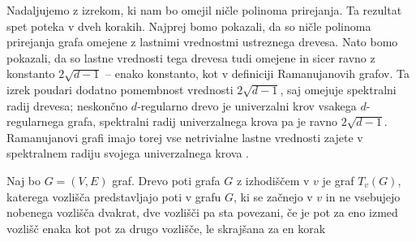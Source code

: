 Nadaljujemo z izrekom, ki nam bo omejil ničle polinoma prirejanja. Ta rezultat spet poteka v dveh korakih. Najprej bomo pokazali, da so ničle polinoma prirejanja grafa omejene z lastnimi vrednostmi ustreznega drevesa. Nato bomo pokazali, da so lastne vrednosti tega drevesa tudi omejene in sicer ravno z konstanto \(2\sqrt{d-1}\) -- enako konstanto, kot v definiciji Ramanujanovih grafov. Ta izrek poudari dodatno pomembnost vrednosti \(2\sqrt{d-1}\), saj omejuje spektralni radij drevesa; neskončno \(d\)-regularno drevo je univerzalni krov vsakega \(d\)-regularnega grafa, spektralni radij univerzalnega krova pa je ravno \(2\sqrt{d-1}\). Ramanujanovi grafi imajo torej vse netrivialne lastne vrednosti zajete v spektralnem radiju svojega univerzalnega krova \cite{hoory}.

\begin{definicija}
    Naj bo \(G=(V, E)\) graf. Drevo poti grafa \(G\) z izhodiščem v \(v\) je graf \(T_v(G)\), katerega vozlišča predstavljajo poti v grafu \(G\), ki se začnejo v \(v\) in ne vsebujejo nobenega vozlišča dvakrat, dve vozlišči pa sta povezani, če je pot za eno izmed vozlišč enaka kot pot za drugo vozlišče, le skrajšana za en korak
\end{definicija}
